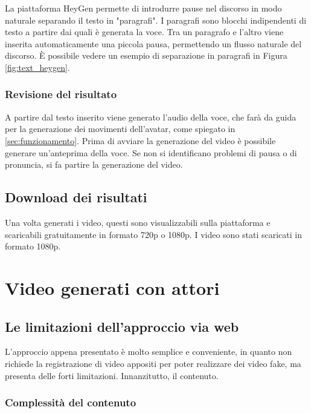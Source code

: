 La piattaforma HeyGen permette di introdurre pause nel discorso in modo naturale separando il testo in "paragrafi". I paragrafi sono blocchi indipendenti di testo a partire dai quali è generata la voce. Tra un paragrafo e l'altro viene inserita automaticamente una piccola pausa, permettendo un flusso naturale del discorso. È possibile vedere un esempio di separazione in paragrafi in Figura \ref{fig:text_heygen}.

\subsubsection{Revisione del risultato}

A partire dal testo inserito viene generato l'audio della voce, che farà da guida per la generazione dei movimenti dell'avatar, come spiegato in \ref{sec:funzionamento}. Prima di avviare la generazione del video è possibile generare un'anteprima della voce. Se non si identificano problemi di pausa o di pronuncia, si fa partire la generazione del video.

\subsection{Download dei risultati}

Una volta generati i video, questi sono visualizzabili sulla piattaforma e scaricabili gratuitamente in formato 720p o 1080p. I video sono stati scaricati in formato 1080p.

\section{Video generati con attori}
\label{sec:generati_con_attori}

\subsection{Le limitazioni dell'approccio via web}

L'approccio appena presentato è molto semplice e conveniente, in quanto non richiede la registrazione di video appositi per poter realizzare dei video fake, ma presenta delle forti limitazioni. Innanzitutto, il contenuto.

\subsubsection{Complessità del contenuto}


